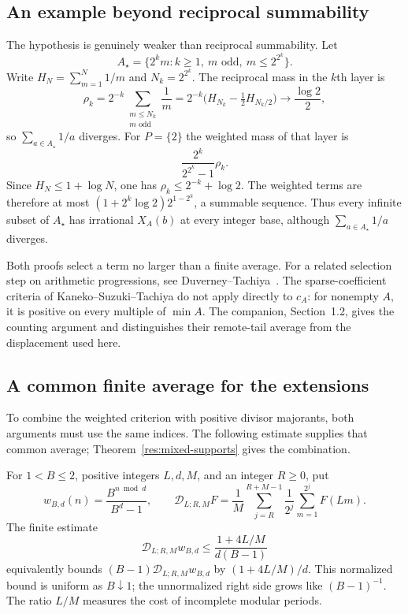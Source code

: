 \documentclass[11pt]{article}
\begin{document}
\subsection{An example beyond reciprocal summability}
The hypothesis is genuinely weaker than reciprocal summability.  Let
\[
 A_\star=\{2^k m:k\ge1,\ m\text{ odd},\ m\le2^{2^k}\}.
\]
Write $H_N=\sum_{m=1}^N1/m$ and $N_k=2^{2^k}$.  The reciprocal mass
in the $k$th layer is
\[
 \rho_k=2^{-k}\sum_{\substack{m\le N_k\\m\text{ odd}}}\frac1m
 =2^{-k}\bigl(H_{N_k}-\tfrac12H_{N_k/2}\bigr)
 \longrightarrow\frac{\log2}{2},
\]
so $\sum_{a\in A_\star}1/a$ diverges.  For $P=\{2\}$ the weighted mass of
that layer is
\[
 \frac{2^k}{2^{2^k}-1}\rho_k.
\]
Since $H_N\le1+\log N$, one has $\rho_k\le2^{-k}+\log2$.
The weighted terms are therefore at most
$(1+2^k\log2)2^{1-2^k}$, a summable sequence.
Thus every infinite subset of $A_\star$ has irrational $X_A(b)$ at
every integer base, although $\sum_{a\in A_\star}1/a$ diverges.

Both proofs select a term no larger than a finite average.  For a
related selection step on arithmetic progressions, see
Duverney--Tachiya~\cite[Section~2, (2.3)--(2.9)]{duverneytachiya}.
The sparse-coefficient criteria of Kaneko--Suzuki--Tachiya
\cite[Theorems~1 and~3]{kanekosuzukitachiya} do not apply directly to
$c_A$: for nonempty $A$, it is positive on every multiple of $\min A$.
The companion, Section~1.2, gives the counting argument and distinguishes
their remote-tail average from the displacement used here.

\subsection{A common finite average for the extensions}\label{sec:common-kernel}
To combine the weighted criterion with positive divisor majorants, both
arguments must use the same indices.  The following estimate supplies
that common average; Theorem~\ref{res:mixed-supports} gives the combination.

For $1<B\le2$, positive integers $L,d,M$, and an integer $R\ge0$, put
\[
 w_{B,d}(n)=\frac{B^{n\bmod d}}{B^d-1},\qquad
 \mathscr D_{L;R,M}F
 =\frac1M\sum_{j=R}^{R+M-1}\frac1{2^j}
      \sum_{m=1}^{2^j}F(Lm).
\]
The finite estimate
\begin{equation*}
 \mathscr D_{L;R,M}w_{B,d}
 \le\frac{1+4L/M}{d(B-1)}
 \tag{S}\label{eq:mixed-finite-kernel}
\end{equation*}
equivalently bounds $(B-1)\mathscr D_{L;R,M}w_{B,d}$ by
$(1+4L/M)/d$.  This normalized bound is uniform as $B\downarrow1$;
the unnormalized right side grows like $(B-1)^{-1}$.
The ratio $L/M$ measures the cost of incomplete modular periods.
\end{document}
